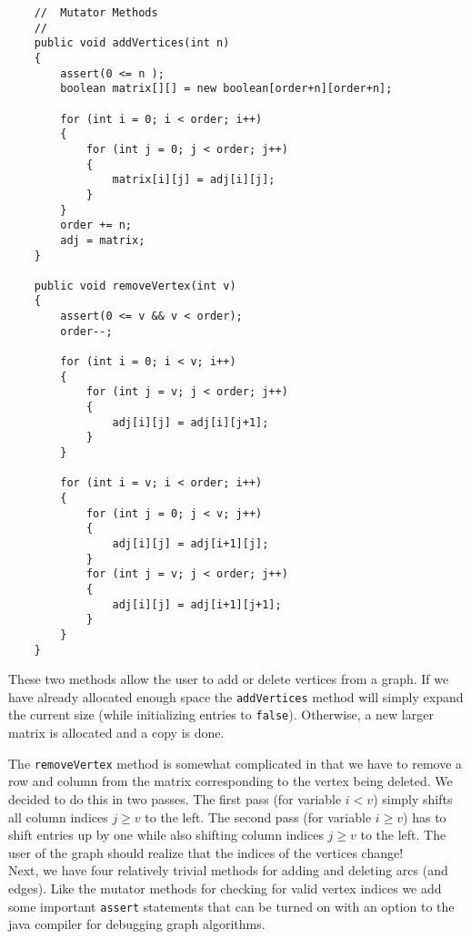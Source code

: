 {\renewcommand{\ttdefault}{pcr} %
\footnotesize \begin{verbatim}
    //  Mutator Methods
    //
    public void addVertices(int n)
    {
        assert(0 <= n );
        boolean matrix[][] = new boolean[order+n][order+n];

        for (int i = 0; i < order; i++)
        {
            for (int j = 0; j < order; j++)
            {
                matrix[i][j] = adj[i][j];
            }
        }
        order += n;
        adj = matrix;
    }

    public void removeVertex(int v)
    {
        assert(0 <= v && v < order);
        order--;

        for (int i = 0; i < v; i++)
        {
            for (int j = v; j < order; j++)
            {
                adj[i][j] = adj[i][j+1];
            }
        }

        for (int i = v; i < order; i++)
        {
            for (int j = 0; j < v; j++)
            {
                adj[i][j] = adj[i+1][j];
            }
            for (int j = v; j < order; j++)
            {
                adj[i][j] = adj[i+1][j+1];
            }
        }
    }
\end{verbatim}%
}

These two methods allow the user to add or delete vertices from a graph.  If we have already allocated
enough space the \verb|addVertices| method will simply expand the current size (while initializing
entries to \verb|false|).   Otherwise, a new larger matrix is allocated  and a copy is done.\\
\fi



The \verb|removeVertex| method is somewhat complicated in that we have to remove a row and column from
the matrix corresponding to the vertex being deleted.  We decided to do this in two passes. The first
pass (for variable $i < v$) simply shifts all column indices $j\geq v$ to the left.  The second pass
(for variable $i \ge v$) has to shift entries up by one while also shifting column indices $j
\geq v$ to the left.  The user of the graph should realize that the
indices of the vertices change!\\

Next, we have four relatively trivial methods for adding and deleting
arcs (and edges). Like the mutator methods for checking for valid vertex
indices we add some important \verb|assert| statements that can be
turned on with an option to the java compiler for debugging graph
algorithms.

